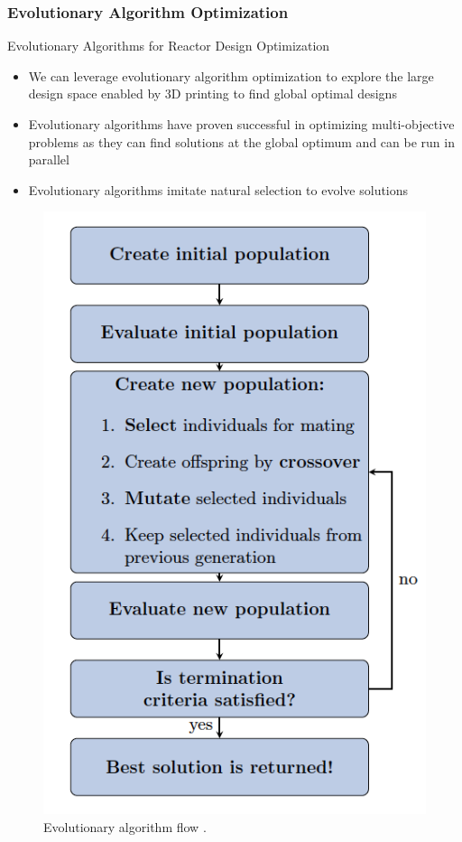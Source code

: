   \begin{frame}
    \frametitle{Evolutionary Algorithm Optimization}
    \begin{block}{Evolutionary Algorithms for Reactor Design Optimization}
    \begin{minipage}[c]{0.6\textwidth}
        \begin{itemize}
            \item We can leverage evolutionary algorithm optimization to 
            explore the large design space enabled by 3D printing to find global 
            optimal designs
            \item Evolutionary algorithms have proven successful in optimizing 
            multi-objective problems as they can find solutions at the global 
            optimum and can be run in parallel
            \item Evolutionary algorithms imitate natural selection to evolve solutions 
            \end{itemize}
  \end{minipage}\hfill
  \begin{minipage}[c]{0.4\textwidth}
    \centering
    \begin{figure}
      \includegraphics[width=0.8\linewidth]{figures/ea-flow.png} 
      \caption{Evolutionary algorithm flow \cite{renner_genetic_2003}. }
    \end{figure}
  \end{minipage}
  \end{block}
  \end{frame}

